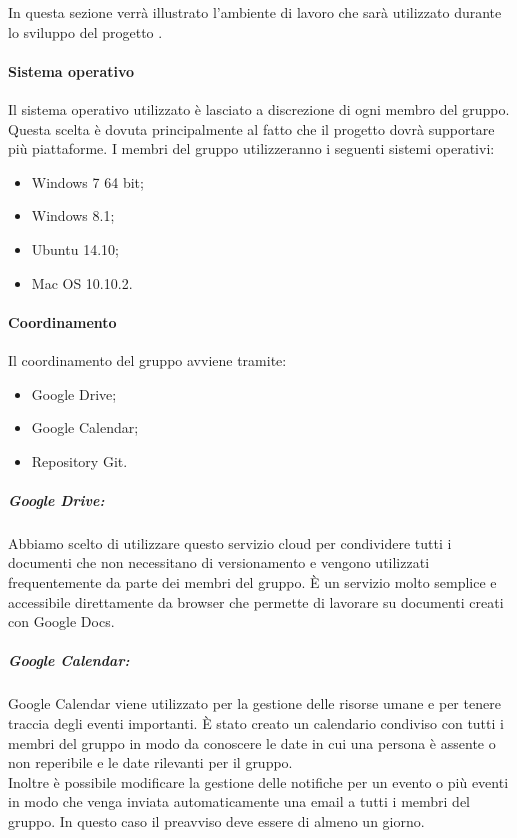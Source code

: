 In questa sezione verrà illustrato l'ambiente di lavoro che sarà utilizzato durante lo sviluppo del progetto \PROGETTO.\\

\paragraph{Sistema operativo}

Il sistema operativo utilizzato è lasciato a discrezione di ogni membro del gruppo. Questa scelta è dovuta principalmente al fatto che il progetto dovrà supportare più piattaforme.
I membri del gruppo utilizzeranno i seguenti sistemi operativi:

\begin{itemize}
	\item \gls{Windows} 7 64 bit;
	\item \gls{Windows} 8.1;
	\item \gls{Ubuntu} 14.10;
	\item Mac OS 10.10.2.
\end{itemize}

\paragraph{Coordinamento}

Il coordinamento del gruppo avviene tramite:
\begin{itemize}
	\item \gls{Google Drive};
	\item \gls{Google Calendar};	
	\item \gls{Repository} \gls{Git}.
\end{itemize}

\subparagraph{Google Drive:}

Abbiamo scelto di utilizzare questo \gls{servizio cloud} per condividere tutti i documenti che non necessitano di \gls{versionamento} e vengono utilizzati frequentemente da parte dei membri del gruppo. 
È un servizio molto semplice e accessibile direttamente da \gls{browser} che permette di lavorare su documenti creati con \gls{Google Docs}.

\subparagraph{Google Calendar:}
\gls{Google Calendar} viene utilizzato per la gestione delle risorse umane e per tenere traccia degli eventi importanti. È stato creato un calendario condiviso con tutti i membri del gruppo in modo da conoscere le date in cui una persona è assente o non reperibile e le date rilevanti per il gruppo.\\
Inoltre è possibile modificare la gestione delle notifiche per un evento o più eventi in modo che venga inviata automaticamente una email a tutti i membri del gruppo. In questo caso il preavviso deve essere di almeno un giorno.

